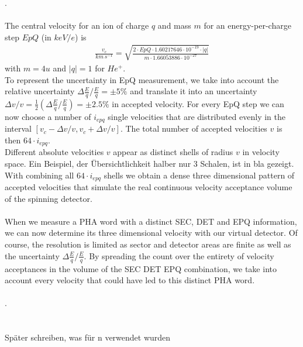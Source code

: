 .
\\ \\
The central velocity for an ion of charge $q$ and mass $m$ for an energy-per-charge step $EpQ$ (in $keV/e$) is
\begin{align*}
\frac{v_c}{km \, s^{-1}} = \sqrt{\frac{2 \cdot EpQ \cdot 1.60217646\cdot10^{-19}\cdot |q|}{m \cdot 1.66053886 \cdot 10^{-27}} }
\end{align*}
with $m = 4 u$ and $|q| = 1$ for $He^{+}$.\\
To represent the uncertainty in EpQ measurement, we take into account the relative uncertainty $\Delta \frac{E}{q}/\frac{E}{q} = \pm 5\%$ and translate it into an uncertainty $\Delta v / v = \frac{1}{2} \left( \Delta \frac{E}{q}/\frac{E}{q}\right) = \pm 2.5\%$ in accepted velocity. For every EpQ step we can now choose a number of $i_{epq}$ single velocities that are distributed evenly in the interval $\left[ v_c - \Delta v / v, v_c + \Delta v / v \right]$. The total number of accepted velocities $v$ is then $64 \cdot i_{epq}$.
\\
Different absolute velocities $v$ appear as distinct shells of radius $v$ in velocity space.
Ein Beispiel, der Übersichtlichkeit halber nur 3 Schalen, ist in bla gezeigt.
\\
With combining all $64 \cdot i_{epq}$ shells we obtain a dense three dimensional pattern of accepted velocities that simulate the real continuous velocity acceptance volume of the spinning detector.
\\ \\
When we measure a PHA word with a distinct SEC, DET and EPQ information, we can now determine its three dimensional velocity with our virtual detector. Of course, the resolution is limited as sector and detector areas are finite as well as the uncertainty $\Delta \frac{E}{q}/\frac{E}{q}$. By spreading the count over the entirety of velocity acceptances in the volume of the SEC DET EPQ combination, we take into account every velocity that could have led to this distinct PHA word.
\\ \\


.\\ \\ \\
Später schreiben, was für n verwendet wurden
